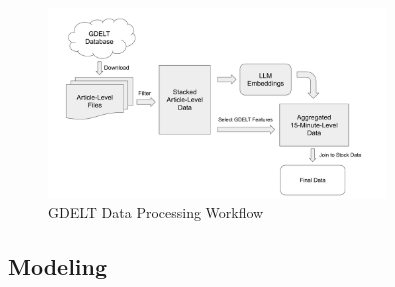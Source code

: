 \documentclass[12pt]{article}
\begin{document}
\begin{figure}[H]
\centering
\caption{GDELT Data Processing Workflow}
\includegraphics[width=0.8\textwidth]{../Output/GDELT Processing Diagram.pdf}
\end{figure}

\subsection{Modeling}
\end{document}
